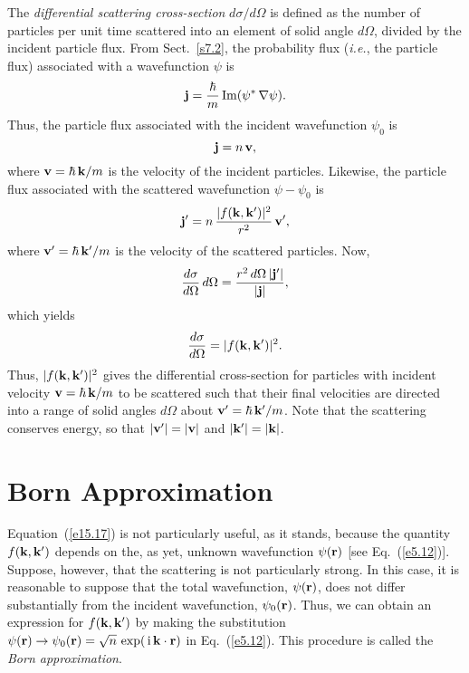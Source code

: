 The {\em differential scattering cross-section}\/ $d\sigma/d\Omega$ is
defined as the number of particles per unit time scattered into
an element of solid angle $d\Omega$, divided by the incident
particle flux. From Sect.~\ref{s7.2}, the probability flux ({\em i.e.}, the
particle flux) associated with a wavefunction $\psi$ is
\begin{equation}
{\bf j} = \frac{\hbar}{m}\,{\rm Im}(\psi^\ast\,\nabla\psi).
\end{equation}
Thus, the particle flux associated with the incident wavefunction $\psi_0$ is
\begin{equation}
{\bf j} = n\,{\bf v},
\end{equation}
where ${\bf v}=\hbar\,{\bf k}/m$ is the velocity of the incident
particles. Likewise, the particle flux associated with the scattered
wavefunction $\psi-\psi_0$ is
\begin{equation}
{\bf j}' = n\,\frac{|f({\bf k},{\bf k}')|^2}{r^2}\,{\bf v}',
\end{equation}
where ${\bf v}' = \hbar\,{\bf k}'/m$ is the velocity of the scattered particles.
Now,
\begin{equation}
\frac{d\sigma}{d\Omega}\,d\Omega = \frac{r^2\,d\Omega\,|{\bf j}'|}{|{\bf j}|},
\end{equation}
which yields
\begin{equation}\label{e15.17}
\frac{d\sigma}{d\Omega} = |f({\bf k},{\bf k}')|^2.
\end{equation}
Thus, $|f({\bf k},{\bf k}')|^2$ gives the differential cross-section
for particles with incident velocity ${\bf v}=\hbar\,{\bf k}/m$ to be scattered such that their final velocities are directed into a range of
solid angles $d\Omega$ about ${\bf v}'=\hbar\,{\bf k}'/m$. Note that the scattering
conserves energy, so that $|{\bf v}'|=|{\bf v}|$ and $|{\bf k}'|=|{\bf k}|$. 

\section{Born Approximation}
Equation~(\ref{e15.17}) is not particularly useful, as it stands, because
the quantity $f({\bf k},{\bf k}')$ depends on the, as yet, unknown wavefunction
$\psi({\bf r})$ [see Eq.~(\ref{e5.12})]. Suppose, however, that the scattering is
not particularly strong. In this case, it is reasonable to suppose that the total
wavefunction, $\psi({\bf r})$, does not differ substantially from the
incident wavefunction, $\psi_0({\bf r})$. Thus, we can
obtain an expression for $f({\bf k},{\bf k}')$ by making the
substitution $\psi({\bf r})\rightarrow\psi_0({\bf r}) = \sqrt{n}\,\exp(\,{\rm i}\,
{\bf k}\cdot{\bf r})$ in Eq.~(\ref{e5.12}). This procedure is called
the {\em Born approximation}.


